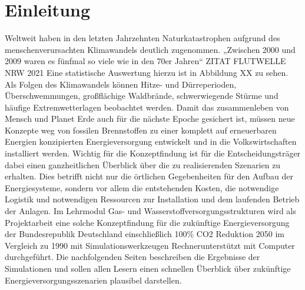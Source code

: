 \section{Einleitung}

Weltweit haben in den letzten Jahrzehnten Naturkatastrophen aufgrund des menschenverursachten Klimawandels deutlich zugenommen. „Zwischen 2000 und 2009 waren es fünfmal so viele wie in den 70er Jahren“ ZITAT FLUTWELLE NRW 2021
Eine statistische Auswertung hierzu ist in Abbildung XX zu sehen. Als Folgen des Klimawandels können Hitze- und Dürreperioden, Überschwemmungen, großflächige Waldbrände, schwerwiegende Stürme und häufige Extremwetterlagen beobachtet werden.
Damit das zusammenleben von Mensch und Planet Erde auch für die nächste Epoche gesichert ist, müssen neue Konzepte weg von fossilen Brennstoffen zu einer komplett auf erneuerbaren Energien konzipierten Energieversorgung entwickelt und in die Volkswirtschaften installiert
werden. Wichtig für die Konzeptfindung ist für die Entscheidungsträger dabei einen ganzheitlichen Überblick über die zu realisierenden Szenarien zu erhalten. Dies betrifft nicht nur die örtlichen Gegebenheiten für den Aufbau der Energiesysteme, sondern vor allem die entstehenden Kosten, die notwendige Logistik und notwendigen Ressourcen zur Installation und dem laufenden Betrieb der Anlagen. Im Lehrmodul Gas- und Wasserstoffversorgungsstrukturen wird als Projektarbeit eine solche Konzeptfindung für die zukünftige Energieversorgung der Bundesrepublik Deutschland einschließlich 100\% CO2 Reduktion 2050 im Vergleich zu 1990 mit Simulationswerkzeugen Rechnerunterstützt mit Computer durchgeführt. Die nachfolgenden Seiten beschreiben die Ergebnisse der Simulationen und sollen allen Lesern einen schnellen Überblick über zukünftige Energieversorgungsszenarien plausibel darstellen. 
